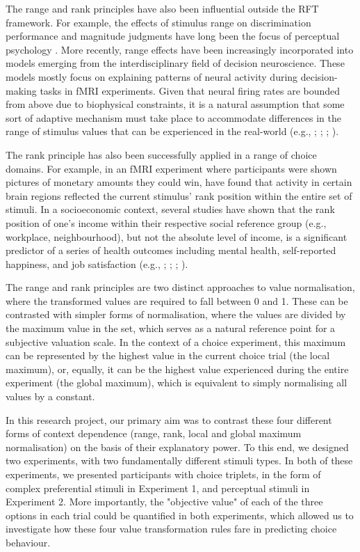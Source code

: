 \documentclass[11pt,a4paper]{article}
\begin{document}
The range and rank principles have also been influential outside the RFT framework. For example, the effects of stimulus range on discrimination performance and magnitude judgments have long been the focus of perceptual psychology \cite{Lockhead1986}. More recently, range effects have been increasingly incorporated into models emerging from the interdisciplinary field of decision neuroscience. These models mostly focus on explaining patterns of neural activity during decision-making tasks in fMRI experiments. Given that neural firing rates are bounded from above due to biophysical constraints, it is a natural assumption that some sort of adaptive mechanism must take place to accommodate differences in the range of stimulus values that can be experienced in the real-world (e.g., ; ; ; ).


The rank principle has also been successfully applied in a range of choice domains. For example, in an fMRI experiment where participants were shown pictures of monetary amounts they could win,  have found that activity in certain brain regions reflected the current stimulus' rank position within the entire set of stimuli. In a socioeconomic context, several studies have shown that the rank position of one's income within their respective social reference group (e.g., workplace, neighbourhood), but not the absolute level of income, is a significant predictor of a series of health outcomes including mental health, self-reported happiness, and job satisfaction (e.g., ; ; ; ).

The range and rank principles are two distinct approaches to value normalisation, where the transformed values are required to fall between 0 and 1. These can be contrasted with simpler forms of normalisation, where the values are divided by the maximum value in the set, which serves as a natural reference point for a subjective valuation scale. In the context of a choice experiment, this maximum can be represented by the highest value in the current choice trial (the local maximum), or, equally, it can be the highest value experienced during the entire experiment (the global maximum), which is equivalent to simply normalising all values by a constant.

In this research project, our primary aim was to contrast these four different forms of context dependence (range, rank, local and global maximum normalisation) on the basis of their explanatory power. To this end, we designed two experiments, with two fundamentally different stimuli types. In both of these experiments, we presented participants with choice triplets, in the form of complex preferential stimuli in Experiment 1, and perceptual stimuli in Experiment 2. More importantly, the "objective value" of each of the three options in each trial could be quantified in both experiments, which allowed us to investigate how these four value transformation rules fare in predicting choice behaviour.
\end{document}
